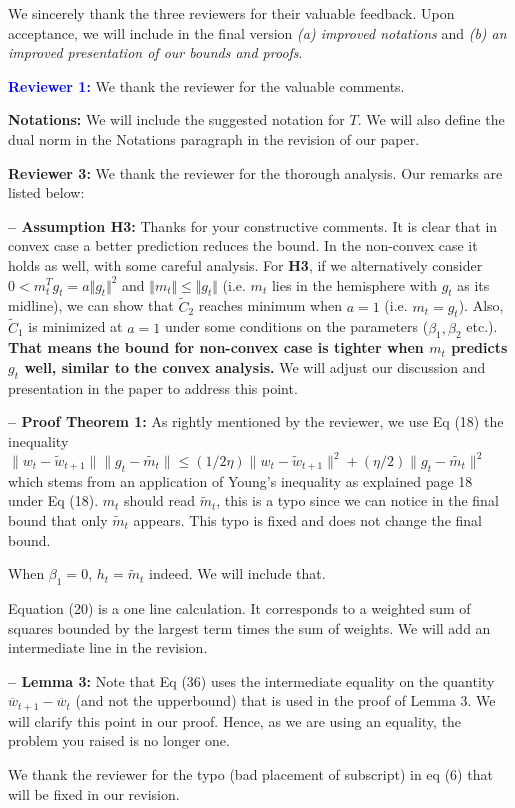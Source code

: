 \documentclass{article}
\begin{document}
We sincerely thank the three reviewers for their valuable feedback. 
Upon acceptance, we will include in the final version \emph{{\sf (a)} improved notations} and \emph{{\sf (b)} an improved presentation of our bounds and proofs}. 


\vspace{0.05in}

\textbf{\textcolor{blue}{Reviewer 1:}} We thank the reviewer for the valuable comments.\vspace{-5pt}


\textbf{Notations:} 
We will include the suggested notation for $T$.
We will also define the dual norm in the Notations paragraph in the revision of our paper.

\vspace{0.05in}


\textbf{\textcolor{green!50!black}{Reviewer 3:}} We thank the reviewer for the thorough analysis. Our remarks are listed below:\vspace{-5pt}

\textbf{-- Assumption H3:}
Thanks for your constructive comments. It is clear that in convex case a better prediction reduces the bound. In the non-convex case it holds as well, with some careful analysis. For \textbf{H3}, if we alternatively consider $0<m_t^T g_t=a\Vert g_t\Vert^2$ and $\Vert m_t\Vert\leq \Vert g_t\Vert$ (i.e. $m_t$ lies in the hemisphere with $g_t$ as its midline), we can show that $\tilde C_2$ reaches minimum when $a=1$ (i.e. $m_t=g_t$). Also, $\tilde C_1$ is minimized at $a=1$ under some conditions on the parameters ($\beta_1,\beta_2$ etc.). \textbf{That means the bound for non-convex case is tighter when $m_t$ predicts $g_t$ well, similar to the convex analysis.} We will adjust our discussion and presentation in the paper to address this point. \vspace{-5pt}

\textbf{-- Proof Theorem 1:} As rightly mentioned by the reviewer, we use Eq (18) the inequality $\|w_t-\tilde{w}_{t+1}\|\|g_t-\tilde{m_t}\|\leq (1/2\eta)\|w_t-\tilde{w}_{t+1}\|^2+ (\eta/2)\|g_t-\tilde{m_t}\|^2$ which stems from an application of Young's inequality as explained page 18 under Eq (18). $m_t$ should read $\tilde{m}_t$, this is a typo since we can notice in the final bound that only $\tilde{m}_t$ appears. This typo is fixed and does not change the final bound.

When $\beta_1 = 0$, $h_t = \tilde{m}_t$ indeed. We will include that.

Equation (20) is a one line calculation. It corresponds to a weighted sum of squares bounded by the largest term times the sum of weights.
We will add an intermediate line in the revision.

\textbf{-- Lemma 3:}
Note that Eq (36) uses the intermediate equality on the quantity $\overline{w}_{t+1} - \overline{w}_t$ (and not the upperbound) that is used in the proof of Lemma 3. We will clarify this point in our proof.
Hence, as we are using an equality, the problem you raised is no longer one.


We thank the reviewer for the typo (bad placement of subscript) in eq (6) that will be fixed in our revision.
\end{document}
